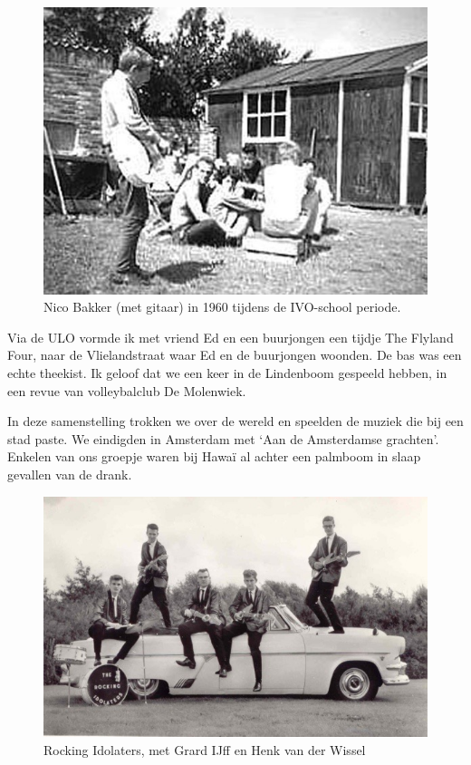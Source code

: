 \documentclass[10pt,twoside, openright]{memoir}
\begin{document}
\begin{figure}
\includegraphics[width=\textwidth]{img/ch25/nico}
\caption*{\footnotesize Nico Bakker (met gitaar) in 1960 tijdens de IVO-school periode.}
\end{figure}

Via de ULO vormde ik met vriend Ed en een buurjongen een tijdje The Flyland Four, naar de Vlielandstraat waar Ed en de buurjongen woonden. De bas was een echte theekist. Ik geloof dat we een keer in de Lindenboom gespeeld hebben, in een revue van volleybalclub De Molenwiek. 

In deze samenstelling trokken we over de wereld en speelden de muziek die bij een stad paste. We eindigden in Amsterdam met `Aan de Amsterdamse grachten'. Enkelen van ons groepje waren bij Hawaï al achter een palmboom in slaap gevallen van de drank. 

\begin{figure}
\includegraphics[width=\textwidth]{img/ch25/ri-2}
\caption*{\footnotesize Rocking Idolaters, met Grard IJff en Henk van der Wissel}
\end{figure}  
\end{document}
